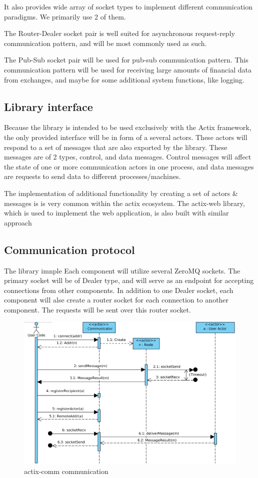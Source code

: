It also provides wide array of socket types to implement different communication paradigms. We primarily use 2 of them.

The Router-Dealer socket pair is well suited for asynchronous request-reply communication pattern, and will be most commonly used as
such.

The Pub-Sub socket pair will be used for pub-sub communication pattern. This communication pattern will be used for receiving
large amounts of financial data from exchanges, and maybe for some additional system functions, like logging.

\subsection{Library interface}
Because the library is intended to be used exclusively with the Actix framework, the only provided interface will be in form
of a several actors. These actors will respond to a set of messages that are also exported by the library. These messages
are of 2 types, control, and data messages. Control messages will affect the state of one or more communication actors
in one process, and data messages are requests to send data to different processes/machines.

The implementation of additional functionality by creating a set of actors \& messages is is very common within the actix ecosystem.
The actix-web library, which is used to implement the web application, is also built with similar approach

\subsection{Communication protocol}
The library imnple
Each component will utilize several ZeroMQ sockets. The primary socket will be of Dealer type, and will serve as an endpoint
for accepting connections from other components. In addition to one Dealer socket, each component will alse create a router
socket for each connection to another component. The requests will be sent over this router socket.

\begin{figure}[H]
    \includegraphics[width=\textwidth]{obrazky-figures/actix-net communication.png}
    \caption{actix-comm communication}
    \label{img:actix_comm}
\end{figure}

